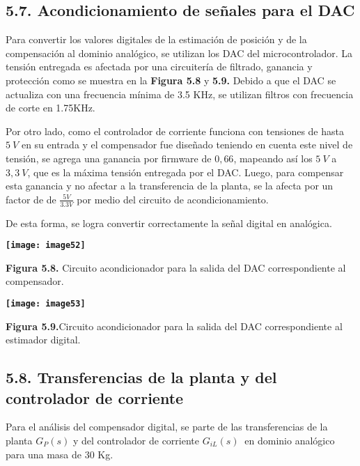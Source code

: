 \documentclass{article} %
\begin{document}
\noindent 
\subsection{5.7. Acondicionamiento de se\~{n}ales para el DAC}

\noindent Para convertir los valores digitales de la estimaci\'{o}n de posici\'{o}n y de la compensaci\'{o}n al dominio anal\'{o}gico, se utilizan los DAC del microcontrolador. La tensi\'{o}n entregada es afectada por una circuiter\'{i}a de filtrado, ganancia y protecci\'{o}n como se muestra en la \textbf{Figura 5.8 }y \textbf{5.9. }Debido a que el DAC se actualiza con una frecuencia m\'{i}nima de 3.5 KHz, se utilizan filtros con frecuencia de corte en 1.75KHz.

\noindent 

\noindent Por otro lado, como el controlador de corriente funciona con tensiones de hasta $5\ V$ en su entrada y el compensador fue dise\~{n}ado teniendo en cuenta este nivel de tensi\'{o}n, se agrega una ganancia por firmware de $0,66$, mapeando as\'{i} los $5\ V$ a $3,3\ V$, que es la m\'{a}xima tensi\'{o}n entregada por el DAC. Luego, para compensar esta ganancia y no afectar a la transferencia de la planta, se la afecta por un factor de de $\frac{5V}{3.3V}$ por medio del circuito de acondicionamiento.

\noindent 

\noindent De esta forma, se logra convertir correctamente la se\~{n}al digital en anal\'{o}gica.

\noindent \textbf{}

\noindent \textbf{\texttt{[image: image52]}}

\noindent \textbf{Figura 5.8. }Circuito acondicionador para la salida del DAC correspondiente al compensador. 

\noindent \textbf{\texttt{[image: image53]}}

\noindent \textbf{Figura 5.9.}Circuito acondicionador para la salida del DAC correspondiente al estimador digital.

\noindent 
\subsection{5.8. Transferencias de la planta y del controlador de corriente}

\noindent Para el an\'{a}lisis del compensador digital, se parte de las transferencias de la planta $G_P(s)$ y del controlador de corriente $G_{iL}(s)\ $ en dominio anal\'{o}gico para una masa de 30 Kg.
\end{document}
